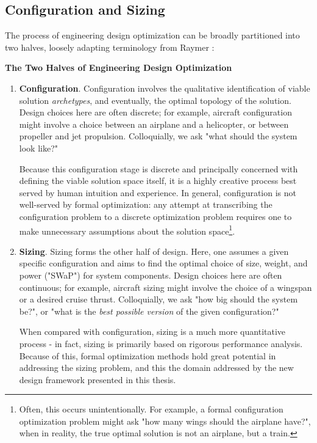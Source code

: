 \subsection{Configuration and Sizing}

The process of engineering design optimization can be broadly partitioned into two halves, loosely adapting terminology from Raymer \cite{raymer}:

\begin{example}
    \textbf{The Two Halves of Engineering Design Optimization}
    \begin{enumerate}
        \item \textbf{Configuration}. Configuration involves the qualitative identification of viable solution \textit{archetypes}, and eventually, the optimal topology of the solution. Design choices here are often discrete; for example, aircraft configuration might involve a choice between an airplane and a helicopter, or between propeller and jet propulsion. Colloquially, we ask "what should the system look like?"

        Because this configuration stage is discrete and principally concerned with defining the viable solution space itself, it is a highly creative process best served by human intuition and experience. In general, configuration is not well-served by formal optimization: any attempt at transcribing the configuration problem to a discrete optimization problem requires one to make unnecessary assumptions about the solution space\footnote{Often, this occurs unintentionally. For example, a formal configuration optimization problem might ask "how many wings should the airplane have?", when in reality, the true optimal solution is not an airplane, but a train.}.

        \item \textbf{Sizing}. Sizing forms the other half of design. Here, one assumes a given specific configuration and aims to find the optimal choice of size, weight, and power ("SWaP") for system components. Design choices here are often continuous; for example, aircraft sizing might involve the choice of a wingspan or a desired cruise thrust. Colloquially, we ask "how big should the system be?", or "what is the \textit{best possible version} of the given configuration?"

        When compared with configuration, sizing is a much more quantitative process - in fact, sizing is primarily based on rigorous performance analysis. Because of this, formal optimization methods hold great potential in addressing the sizing problem, and this the domain addressed by the new design framework presented in this thesis.

    \end{enumerate}
\end{example}

